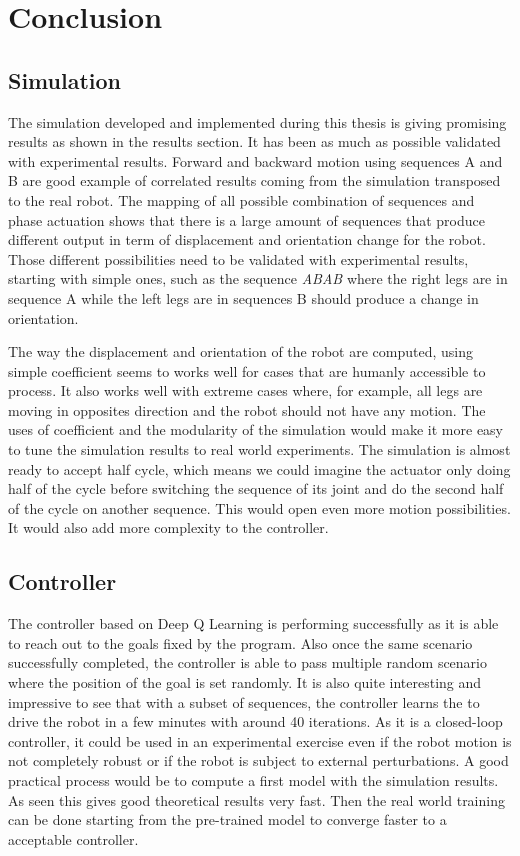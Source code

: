\chapter{Conclusion}

\section{Simulation}
    The simulation developed and implemented during this thesis is giving promising results as shown in the results section. It has been as much as possible validated with experimental results. Forward and backward motion using sequences A and B are good example of correlated results coming from the simulation transposed to the real robot. The mapping of all possible combination of sequences and phase actuation shows that there is a large amount of sequences that produce different output in term of displacement and orientation change for the robot. Those different possibilities need to be validated with experimental results, starting with simple ones, such as the sequence \textit{ABAB} where the right legs are in sequence A while the left legs are in sequences B should produce a change in orientation.
    
    The way the displacement and orientation of the robot are computed, using simple coefficient seems to works well for cases that are humanly accessible to process. It also works well with extreme cases where, for example, all legs are moving in opposites direction and the robot should not have any motion. The uses of coefficient and the modularity of the simulation would make it more easy to tune the simulation results to real world experiments. The simulation is almost ready to accept half cycle, which means we could imagine the actuator only doing half of the cycle before switching the sequence of its joint and do the second half of the cycle on another sequence. This would open even more motion possibilities. It would also add more complexity to the controller.
    
\section{Controller}
    The controller based on Deep Q Learning is performing successfully as it is able to reach out to the goals fixed by the program. Also once the same scenario successfully completed, the controller is able to pass multiple random scenario where the position of the goal is set randomly. It is also quite interesting and impressive to see that with a subset of sequences, the controller learns the to drive the robot in a few minutes with around 40 iterations. As it is a closed-loop controller, it could be used in an experimental exercise even if the robot motion is not completely robust or if the robot is subject to external perturbations. A good practical process would be to compute a first model with the simulation results. As seen this gives good theoretical results very fast. Then the real world training can be done starting from the pre-trained model to converge faster to a acceptable controller.

